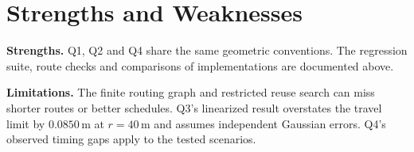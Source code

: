 \section{Strengths and Weaknesses}\label{sec:sw}

\textbf{Strengths.} Q1, Q2 and Q4 share the same geometric conventions. The
regression suite, route checks and comparisons of implementations are documented
above.

\textbf{Limitations.} The finite routing graph and restricted reuse search can miss
shorter routes or better schedules. Q3's linearized result overstates the travel
limit by $0.0850\,\mathrm{m}$ at $r=40\,\mathrm{m}$ and assumes independent Gaussian
errors. Q4's observed timing gaps apply to the tested scenarios.
